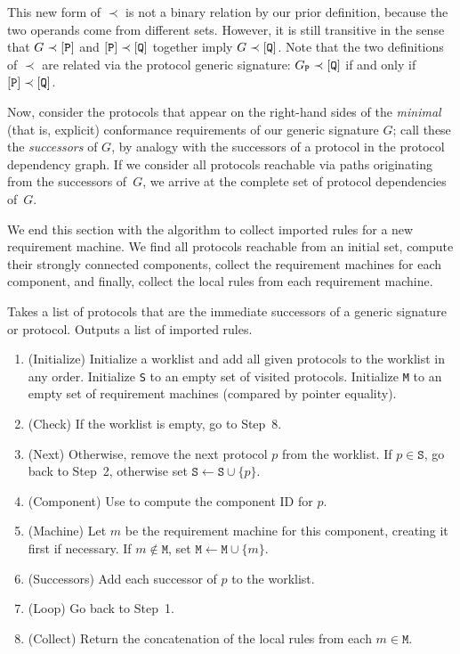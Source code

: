 \documentclass[../generics]{subfiles}
\begin{document}
This new form of $\prec$ is not a binary relation by our prior definition, because the two operands come from different sets. However, it is still transitive in the sense that $G\prec[\texttt{P}]$ and $[\texttt{P}]\prec[\texttt{Q}]$ together imply $G\prec[\texttt{Q}]$. Note that the two definitions of $\prec$ are related via the protocol generic signature: $G_\texttt{P}\prec[\texttt{Q}]$ if and only if $[\texttt{P}]\prec[\texttt{Q}]$.

Now, consider the protocols that appear on the right-hand sides of the \emph{minimal} (that is, explicit) conformance requirements of our generic signature $G$; call these the \emph{successors} of $G$, by analogy with the successors of a protocol in the protocol dependency graph. If we consider all protocols reachable via paths originating from the successors of~$G$, we arrive at the complete set of protocol dependencies of~$G$.

We end this section with the algorithm to collect imported rules for a new requirement machine. We find all protocols reachable from an initial set, compute their strongly connected components, collect the requirement machines for each component, and finally, collect the local rules from each requirement machine.
\begin{algorithm}\label{importing rules}
Takes a list of protocols that are the immediate successors of a generic signature or protocol. Outputs a list of imported rules.
\begin{enumerate}
\item (Initialize) Initialize a worklist and add all given protocols to the worklist in any order. Initialize \texttt{S} to an empty set of visited protocols. Initialize \texttt{M} to an empty set of requirement machines (compared by pointer equality).
\item (Check) If the worklist is empty, go to Step~8.
\item (Next) Otherwise, remove the next protocol $p$ from the worklist. If $p\in\texttt{S}$, go back to Step~2, otherwise set $\texttt{S}\leftarrow\texttt{S}\cup\{p\}$.
\item (Component) Use  to compute the component ID for $p$.
\item (Machine) Let $m$ be the requirement machine for this component, creating it first if necessary. If $m\notin\texttt{M}$, set $\texttt{M}\leftarrow\texttt{M}\cup\{m\}$.
\item (Successors) Add each successor of $p$ to the worklist.
\item (Loop) Go back to Step~1.
\item (Collect) Return the concatenation of the local rules from each $m\in\texttt{M}$.
\end{enumerate}
\end{algorithm}
\end{document}
